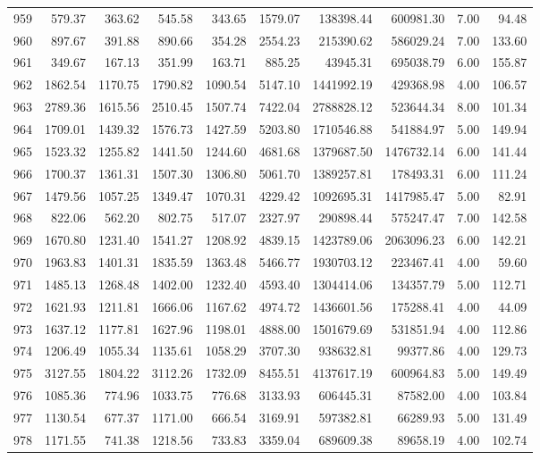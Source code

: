 \begin{tabular}{lrrrrrrrrr}
959 & 579.37 & 363.62 & 545.58 & 343.65 & 1579.07 & 138398.44 & 600981.30 & 7.00 & 94.48 \\
960 & 897.67 & 391.88 & 890.66 & 354.28 & 2554.23 & 215390.62 & 586029.24 & 7.00 & 133.60 \\
961 & 349.67 & 167.13 & 351.99 & 163.71 & 885.25 & 43945.31 & 695038.79 & 6.00 & 155.87 \\
962 & 1862.54 & 1170.75 & 1790.82 & 1090.54 & 5147.10 & 1441992.19 & 429368.98 & 4.00 & 106.57 \\
963 & 2789.36 & 1615.56 & 2510.45 & 1507.74 & 7422.04 & 2788828.12 & 523644.34 & 8.00 & 101.34 \\
964 & 1709.01 & 1439.32 & 1576.73 & 1427.59 & 5203.80 & 1710546.88 & 541884.97 & 5.00 & 149.94 \\
965 & 1523.32 & 1255.82 & 1441.50 & 1244.60 & 4681.68 & 1379687.50 & 1476732.14 & 6.00 & 141.44 \\
966 & 1700.37 & 1361.31 & 1507.30 & 1306.80 & 5061.70 & 1389257.81 & 178493.31 & 6.00 & 111.24 \\
967 & 1479.56 & 1057.25 & 1349.47 & 1070.31 & 4229.42 & 1092695.31 & 1417985.47 & 5.00 & 82.91 \\
968 & 822.06 & 562.20 & 802.75 & 517.07 & 2327.97 & 290898.44 & 575247.47 & 7.00 & 142.58 \\
969 & 1670.80 & 1231.40 & 1541.27 & 1208.92 & 4839.15 & 1423789.06 & 2063096.23 & 6.00 & 142.21 \\
970 & 1963.83 & 1401.31 & 1835.59 & 1363.48 & 5466.77 & 1930703.12 & 223467.41 & 4.00 & 59.60 \\
971 & 1485.13 & 1268.48 & 1402.00 & 1232.40 & 4593.40 & 1304414.06 & 134357.79 & 5.00 & 112.71 \\
972 & 1621.93 & 1211.81 & 1666.06 & 1167.62 & 4974.72 & 1436601.56 & 175288.41 & 4.00 & 44.09 \\
973 & 1637.12 & 1177.81 & 1627.96 & 1198.01 & 4888.00 & 1501679.69 & 531851.94 & 4.00 & 112.86 \\
974 & 1206.49 & 1055.34 & 1135.61 & 1058.29 & 3707.30 & 938632.81 & 99377.86 & 4.00 & 129.73 \\
975 & 3127.55 & 1804.22 & 3112.26 & 1732.09 & 8455.51 & 4137617.19 & 600964.83 & 5.00 & 149.49 \\
976 & 1085.36 & 774.96 & 1033.75 & 776.68 & 3133.93 & 606445.31 & 87582.00 & 4.00 & 103.84 \\
977 & 1130.54 & 677.37 & 1171.00 & 666.54 & 3169.91 & 597382.81 & 66289.93 & 5.00 & 131.49 \\
978 & 1171.55 & 741.38 & 1218.56 & 733.83 & 3359.04 & 689609.38 & 89658.19 & 4.00 & 102.74 \\

\end{tabular}
